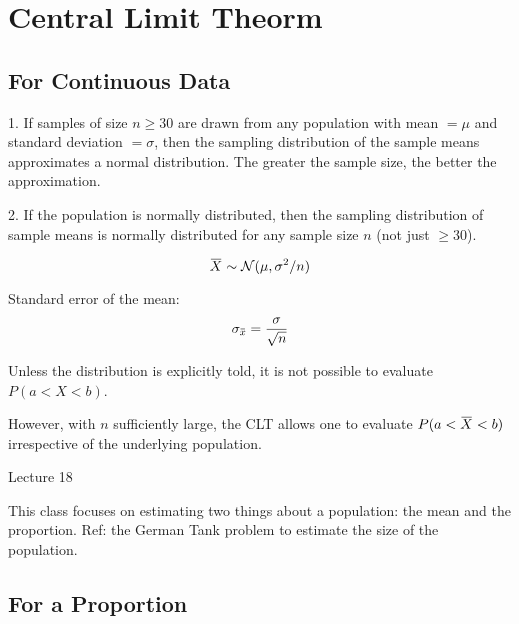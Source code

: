 \documentclass[11pt, oneside]{article}   	%
\newcommand{\overbar}[1]{\mkern 1.5mu\overline{\mkern-1.5mu#1\mkern-1.5mu}\mkern 1.5mu}
\begin{document}
\section{Central Limit Theorm}

\subsection{For Continuous Data}

1. If samples of size $n \geq 30$ are drawn from any population with mean $= \mu$ and standard deviation $= \sigma$, then the sampling distribution of the sample means approximates a normal distribution. The greater the sample size, the better the approximation.

2. If the population is normally distributed, then the sampling distribution of sample means is normally distributed for any sample size $n$ (not just $\geq 30$).

\[
\overbar{X} \sim \mathcal{N}(\mu, \sigma^2 / n)
\]

Standard error of the mean:
\[
\sigma_{\overbar{x}} = \frac{\sigma}{\sqrt{n}}
\]

Unless the distribution is explicitly told, it is not possible to evaluate $P(a < X < b)$.

However, with $n$ sufficiently large, the CLT allows one to evaluate $P(a < \overbar{X} < b)$ irrespective of the underlying population.

Lecture 18

This class focuses on estimating two things about a population: the mean and the proportion. Ref: the German Tank problem to estimate the size of the population.

\subsection{For a Proportion}
\end{document}
